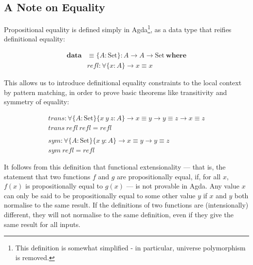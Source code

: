 \documentclass[a4paper]{jfp}
\begin{document}
\subsection{A Note on Equality}

Propositional equality is defined simply in Agda\footnote{This definition is somewhat simplified - in particular, universe polymorphism is removed.}, as a data type that reifies definitional equality:

\begin{displaymath}
	\begin{array}{ll}
	\textbf{data} &\! \equiv \{A : \text{Set}\} : A \rightarrow A \rightarrow \text{Set}\ \textbf{where} \\
	              &\! \mathit{refl} : \forall \{x : A\} \rightarrow x \equiv x
    \end{array}
\end{displaymath}

\medskip

This allows us to introduce definitional equality constraints to the local context by pattern matching, in order to prove basic theorems like transitivity and symmetry of equality:

\begin{displaymath}
	\begin{array}{l}
		\mathit{trans} :  \forall \{A : \text{Set}\}\{x\ y\ z : A\} \rightarrow x \equiv y \rightarrow y \equiv z \rightarrow x \equiv z \\
		\mathit{trans}\ \mathit{refl}\ \mathit{refl} = \mathit{refl} \\
		\\
		\mathit{sym} : \forall \{A : \text{Set}\}\{x\ y : A\} \rightarrow x \equiv y \rightarrow y \equiv z \\
		\mathit{sym}\ \mathit{refl} = \mathit{refl}
    \end{array}
\end{displaymath}

\medskip

It follows from this definition that functional extensionality --- that is, the statement that two functions $f$ and $g$ are propositionally equal, if, for all $x$, $f(x)$ is propositionally equal to $g(x)$ --- is not provable in Agda. Any value $x$ can only be said to be propositionally equal to some other value $y$ if $x$ and $y$ both normalise to the same result. If the definitions of two functions are (intensionally) different, they will not normalise to the same definition, even if they give the same result for all inputs.
\end{document}
